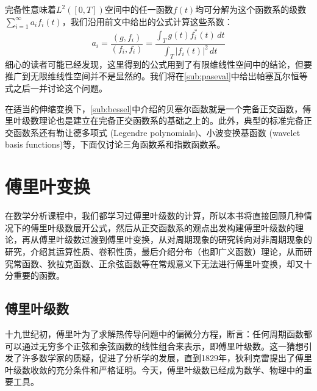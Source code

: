 \documentclass{ctexbook}
\begin{document}
完备性意味着$L^2([0,T])$空间中的任一函数$f(t)$均可分解为这个函数系的级数$\sum_{i = 1}^{\infty}  a_i f_i(t)$，我们沿用前文中给出的公式计算这些系数：
\[a_i=\frac{(g,f_i)}{(f_i,f_i)}=\frac{\int_{T}g(t)f_i^*(t)\,dt}{\int_{T}|f_i(t)|^2\,dt}\]
细心的读者可能已经发现，这里得到的公式用到了有限维线性空间中的结论，但要推广到无限维线性空间并不是显然的。我们将在\ref{sub:paseval}中给出帕塞瓦尔恒等式之后一并讨论这个问题。

在适当的伸缩变换下，\ref{sub:bessel}中介绍的贝塞尔函数就是一个完备正交函数，傅里叶级数理论也是建立在完备正交函数系的基础之上的。此外，典型的标准完备正交函数系还有勒让德多项式 (Legendre polynomials)、小波变换基函数 (wavelet basis functions)等，下面仅讨论三角函数系和指数函数系。

\chapter{傅里叶变换}%
在数学分析课程中，我们都学习过傅里叶级数的计算，所以本书将直接回顾几种情况下的傅里叶级数展开公式，然后从正交函数系的观点出发构建傅里叶级数的理论，再从傅里叶级数过渡到傅里叶变换，从对周期现象的研究转向对非周期现象的研究，介绍其运算性质、卷积性质，最后介绍分布（也即广义函数）理论，从而研究常函数、狄拉克函数、正余弦函数等在常规意义下无法进行傅里叶变换，却又十分重要的函数。

\section{傅里叶级数}\label{sec:Fourier_Series}

十九世纪初，傅里叶为了求解热传导问题中的偏微分方程，断言：任何周期函数都可以通过无穷多个正弦和余弦函数的线性组合来表示，即傅里叶级数。这一猜想引发了许多数学家的质疑，促进了分析学的发展，直到1829年，狄利克雷提出了傅里叶级数收敛的充分条件和严格证明。今天，傅里叶级数已经成为数学、物理中的重要工具。
\end{document}
